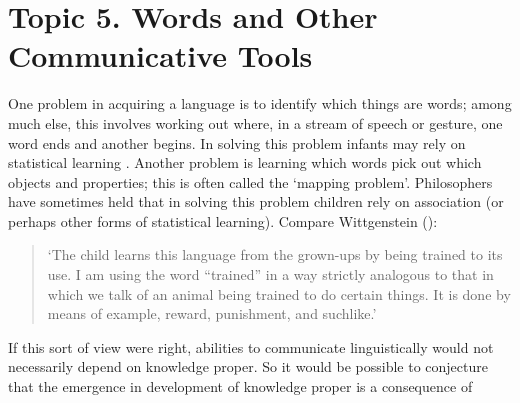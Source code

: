 \documentclass[12pt,\papersize]{extarticle}
\begin{document}
\section{Topic 5. Words and Other Communicative Tools}
One problem in acquiring a language is to identify which things are words; among much else, this involves working out where, in a stream of speech or gesture, one word ends and another begins.  
In solving this problem infants may rely on statistical learning \citep{Saffran:1996aj}.
Another problem is learning which words pick out which objects and properties; this is often called the `mapping problem'. 
Philosophers have sometimes held that in solving this problem children rely on association (or perhaps other forms of statistical learning).
Compare Wittgenstein (\citeyear[p.\ 77]{Wittgenstein:1972lj}): 
%
\begin{quote}
`The child learns this language from the grown-ups by being trained to its use. I am using the word ``trained'' in a way strictly analogous to that in which we talk of an animal being trained to do certain things. It is done by means of example, reward, punishment, and suchlike.'
%
\end{quote}
%
If this sort of view were right, abilities to communicate linguistically would not necessarily depend on knowledge proper. 
So it would be possible to conjecture that the emergence in development of knowledge proper is a consequence of 
\end{document}
